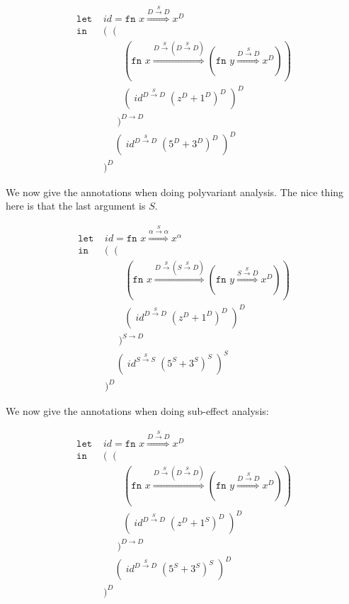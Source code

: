 \documentclass[a4wide,12pt]{article}
\theoremstyle{definition}
\theoremstyle{plain}
\theoremstyle{remark}
\begin{document}
\begin{align*}
\texttt{let } & id = \texttt{fn } x \overset{D \overset{S}{\to} D}{\Rightarrow} x^{D} \\
\texttt{in } & (\;\;( \\
             & \;\;\;\;\;\;\;(\texttt{fn } x \overset{D \overset{S}{\to} (D \overset{S}{\to} D)}{\Rightarrow} (\texttt{fn } y
             \overset{D \overset{S}{\to} D}{\Rightarrow} x^{D})) \\
             & \;\;\;\;\;\;\;(\;id^{D \overset{S}{\to} D} \; (z^{D} + 1^{D})^{D}\;)^{D}  \\
             & \;\;\;\;\;)^{D \to D} \\
             & \;\;\;\;(\;id^{D \overset{S}{\to} D} \; (5^{D} + 3^{D})^{D}\;)^{D}   \\
             & )^{D}
\end{align*}

We now give the annotations when doing polyvariant analysis. The nice thing here
is that the last argument is $S$.

\begin{align*}
\texttt{let } & id = \texttt{fn } x \overset{\alpha \overset{S}{\to} \alpha}{\Rightarrow} x^{\alpha} \\
\texttt{in } & (\;\;( \\
             & \;\;\;\;\;\;\;(\texttt{fn } x \overset{D \overset{S}{\to} (S \overset{S}{\to} D)}{\Rightarrow} (\texttt{fn } y
             \overset{S \overset{S}{\to} D}{\Rightarrow} x^{D})) \\
             & \;\;\;\;\;\;\;(\;id^{D \overset{S}{\to} D} \; (z^{D} + 1^{D})^{D}\;)^{D}  \\
             & \;\;\;\;\;)^{S \to D} \\
             & \;\;\;\;(\;id^{S \overset{S}{\to} S} \; (5^{S} + 3^{S})^{S}\;)^{S}   \\
             & )^{D}
\end{align*}

We now give the annotations when doing sub-effect analysis:

\begin{align*}
\texttt{let } & id = \texttt{fn } x \overset{D \overset{S}{\to} D}{\Rightarrow} x^{D} \\
\texttt{in } & (\;\;( \\
             & \;\;\;\;\;\;\;(\texttt{fn } x \overset{D \overset{S}{\to} (D \overset{S}{\to} D)}{\Rightarrow} (\texttt{fn } y
             \overset{D \overset{S}{\to} D}{\Rightarrow} x^{D})) \\
             & \;\;\;\;\;\;\;(\;id^{D \overset{S}{\to} D} \; (z^{D} + 1^{S})^{D}\;)^{D}  \\
             & \;\;\;\;\;)^{D \to D} \\
             & \;\;\;\;(\;id^{D \overset{S}{\to} D} \; (5^{S} + 3^{S})^{S}\;)^{D}   \\
             & )^{D}
\end{align*}
\end{document}
